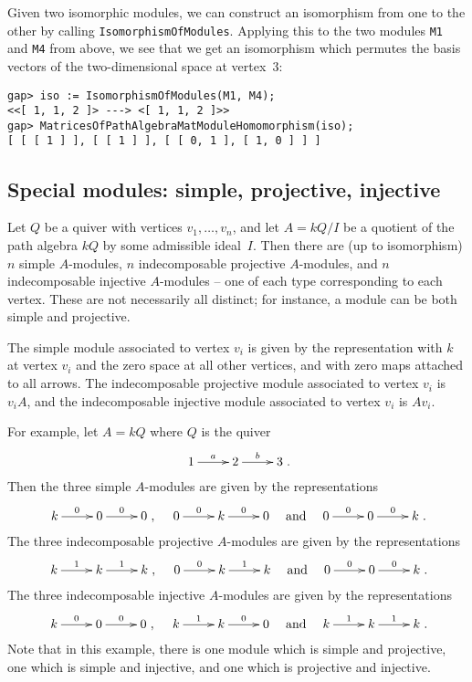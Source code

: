 \documentclass{amsart}
\theoremstyle{definition}
\theoremstyle{theoretic}
\begin{document}
Given two isomorphic modules, we can construct an isomorphism from one
to the other by calling \texttt{IsomorphismOfModules}.  Applying this
to the two modules \texttt{M1} and \texttt{M4} from above, we see that
we get an isomorphism which permutes the basis vectors of the
two-dimensional space at vertex~$3$:
\begin{verbatim}
gap> iso := IsomorphismOfModules(M1, M4);
<<[ 1, 1, 2 ]> ---> <[ 1, 1, 2 ]>>
gap> MatricesOfPathAlgebraMatModuleHomomorphism(iso);
[ [ [ 1 ] ], [ [ 1 ] ], [ [ 0, 1 ], [ 1, 0 ] ] ]
\end{verbatim}


\subsection{Special modules: simple, projective, injective}
Let $Q$ be a quiver with vertices $v_1, \ldots, v_n$, and let $A =
kQ/I$ be a quotient of the path algebra $kQ$ by some admissible
ideal~$I$.  Then there are (up to isomorphism) $n$ simple $A$-modules,
$n$ indecomposable projective $A$-modules, and $n$ indecomposable
injective $A$-modules -- one of each type corresponding to each
vertex.  These are not necessarily all distinct; for instance, a
module can be both simple and projective.

The simple module associated to vertex $v_i$ is given by the
representation with $k$ at vertex $v_i$ and the zero space at all
other vertices, and with zero maps attached to all arrows.  The
indecomposable projective module associated to vertex $v_i$ is $v_i
A$, and the indecomposable injective module associated to vertex $v_i$
is $A v_i$.

For example, let $A = kQ$ where $Q$ is the quiver
\[
\xymatrix{1 \ar[r]^a & 2 \ar[r]^b & 3}.
\]
Then the three simple $A$-modules are given by the representations
\[
\xymatrix{k \ar[r]^0 & 0 \ar[r]^0 & 0},\quad
\xymatrix{0 \ar[r]^0 & k \ar[r]^0 & 0}
\quad\text{and}\quad
\xymatrix{0 \ar[r]^0 & 0 \ar[r]^0 & k}.
\]
The three indecomposable projective $A$-modules are given by the
representations
\[
\xymatrix{k \ar[r]^1 & k \ar[r]^1 & k},\quad
\xymatrix{0 \ar[r]^0 & k \ar[r]^1 & k}
\quad\text{and}\quad
\xymatrix{0 \ar[r]^0 & 0 \ar[r]^0 & k}.
\]
The three indecomposable injective $A$-modules are given by the
representations
\[
\xymatrix{k \ar[r]^0 & 0 \ar[r]^0 & 0},\quad
\xymatrix{k \ar[r]^1 & k \ar[r]^0 & 0}
\quad\text{and}\quad
\xymatrix{k \ar[r]^1 & k \ar[r]^1 & k}.
\]
Note that in this example, there is one module which is simple and
projective, one which is simple and injective, and one which is
projective and injective.
\end{document}
